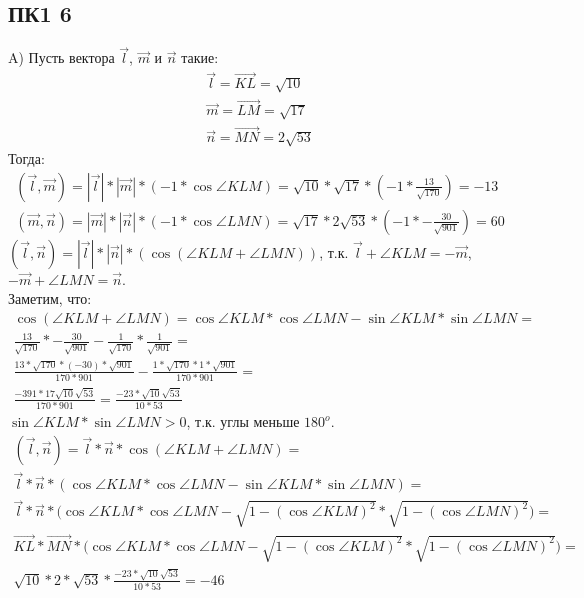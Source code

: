 		\subsection{ПК1 6}
		\begin{figure}[h]
		\end{figure}			
		A)
		Пусть вектора $\overrightarrow{l}$, $\overrightarrow{m}$ и $\overrightarrow{n}$ такие: 
		\begin{gather*} 
			\overrightarrow{l} = \overrightarrow{KL} = \sqrt{10}\\
			\overrightarrow{m} = \overrightarrow{LM} = \sqrt{17}\\
			\overrightarrow{n} = \overrightarrow{MN} = 2\sqrt{53}
		\end{gather*}	
		Тогда: 
		\begin{gather*} 
			(\overrightarrow{l}, \overrightarrow{m}) = |\overrightarrow{l}|*|\overrightarrow{m}|*(-1*\cos\angle KLM) = \sqrt{10} * \sqrt{17} * (-1 * \frac{13}{\sqrt{170}}) = -13 \\
			(\overrightarrow{m}, \overrightarrow{n}) = |\overrightarrow{m}|*|\overrightarrow{n}|*(-1*\cos\angle LMN) = \sqrt{17} * 2\sqrt{53} * (-1 * -\frac{30}{\sqrt{901}}) = 60
		\end{gather*}
		$(\overrightarrow{l}, \overrightarrow{n}) = |\overrightarrow{l}|*|\overrightarrow{n}|*(\cos(\angle KLM + \angle LMN))$, т.к. $\overrightarrow{l} + \angle KLM = - \overrightarrow{m}$, $-\overrightarrow{m} + \angle LMN = \overrightarrow{n}$.\\ Заметим, что: 
		\begin{gather*} 
			\cos(\angle KLM + \angle LMN) = 
			\cos\angle KLM * \cos\angle LMN - \sin\angle KLM * \sin\angle LMN = \\
			\frac{13}{\sqrt{170}} * -\frac{30}{\sqrt{901}} - \frac{1}{\sqrt{170}} * \frac{1}{\sqrt{901}} = \\
			\frac{13*\sqrt{170}*(-30)*\sqrt{901}}{170*901} - \frac{1*\sqrt{170}*1*\sqrt{901}}{170*901} = \\
			\frac{-391*17\sqrt{10}\sqrt{53}}{170*901} = 
			\frac{-23*\sqrt{10}\sqrt{53}}{10*53}
		\end{gather*}
		$\sin \angle KLM * \sin \angle LMN > 0$, т.к. углы меньше $180^o$.
		\\
		\begin{gather*} 
			(\overrightarrow{l}, \overrightarrow{n}) = \overrightarrow{l} * \overrightarrow{n} * \cos(\angle KLM + \angle LMN) = \\
			\overrightarrow{l} * \overrightarrow{n} * (\cos \angle KLM * \cos \angle LMN - \sin \angle KLM * \sin \angle LMN) = \\
			\overrightarrow{l} * \overrightarrow{n} * \biggl( \cos \angle KLM * \cos \angle LMN - \sqrt{1 - (\cos \angle KLM)^2} * \sqrt{1 - (\cos \angle LMN)^2} \biggl)= \\
			\overrightarrow{KL} * \overrightarrow{MN} * \biggl( \cos \angle KLM * \cos \angle LMN - \sqrt{1 - (\cos \angle KLM)^2} * \sqrt{1 - (\cos \angle LMN)^2} \biggl)= \\
			\sqrt{10}*2*\sqrt{53}*\frac{-23*\sqrt{10}\sqrt{53}}{10*53} = -46 
		\end{gather*}
